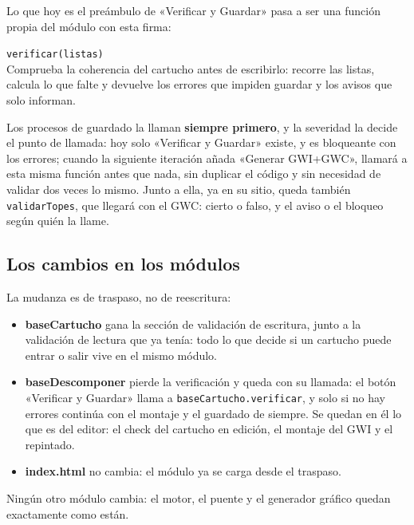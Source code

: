 Lo que hoy es el preámbulo de «Verificar y Guardar» pasa a ser
una función propia del módulo con esta firma:

		
\begin{description}
	\item \texttt{verificar(listas)} \\
	Comprueba la coherencia del cartucho antes de escribirlo: recorre las listas, calcula lo que falte y devuelve los errores que impiden guardar y los avisos que solo informan.
\end{description}


Los procesos de guardado la llaman \textbf{siempre primero}, y la
severidad la decide el punto de llamada: hoy solo «Verificar y
Guardar» existe, y es bloqueante con los errores; cuando la
siguiente iteración añada «Generar GWI+GWC», llamará a esta
misma función antes que nada, sin duplicar el código y sin necesidad de validar dos
veces lo mismo. Junto a ella, ya en su sitio, queda también
\texttt{validarTopes}, que llegará con el GWC: cierto o falso, y
el aviso o el bloqueo según quién la llame.

\subsection{Los cambios en los módulos}
\label{sec:F5I5Cambios}

La mudanza es de traspaso, no de reescritura:

\begin{itemize}
	\item \textbf{baseCartucho} gana la sección de validación de
	escritura, junto a la validación de lectura que ya tenía: todo
	lo que decide si un cartucho puede entrar o salir vive en el
	mismo módulo.
	
	\item \textbf{baseDescomponer} pierde la verificación y queda
	con su llamada: el botón «Verificar y Guardar» llama a
	\texttt{baseCartucho.verificar}, y solo si no hay errores
	continúa con el montaje y el guardado de siempre. Se quedan en
	él lo que es del editor: el check del cartucho en edición, el
	montaje del GWI y el repintado.
	
	\item \textbf{index.html} no cambia: el módulo ya se carga
	desde el traspaso.
\end{itemize}

Ningún otro módulo cambia: el motor, el puente y el generador
gráfico quedan exactamente como están.

